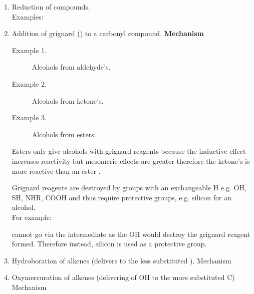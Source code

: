 \begin{enumerate}

  \item Reduction of  compounds.\\
    Examples:

  \item Addition of grignard () to a carbonyl compound.
    \textbf{Mechanism}

    \begin{description}
      \item[Example 1.] Alcohols from aldehyde's.\\

      \item[Example 2.] Alcohols from ketone's.\\

      \item[Example 3.] Alcohols from esters.\\
    \end{description}

    Esters only give alcohols with grignard reagents because the inductive
    effect increases reactivity but mesomeric effects are greater therefore
    the ketone's  is more reactive than an ester .


    Grignard reagents are destroyed by groups with an exchangeable H e.g. OH,
    SH, NHR, COOH and thus require protective groups, e.g. silicon for an
    alcohol.\\

    For example:

     cannot go via the intermediate
     as the OH would destroy the
    grignard reagent formed. Therefore instead, silicon is used as a protective group.


  \item Hydroboration of alkenes (delivers  to the less substituted
    ).
    Mechanism

  \item Oxymercuration of alkenes (delivering of OH to the more substituted C)
    Mechanism

\end{enumerate}

